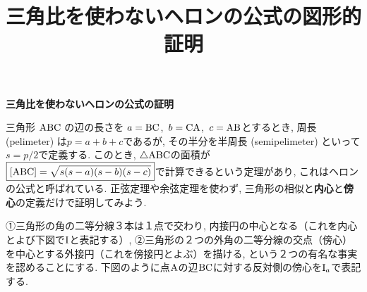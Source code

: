 \documentclass[a4paper,11pt]{ltjsarticle}
\title{三角比を使わないヘロンの公式の図形的証明}
\author{}
\date{}
\begin{document}
\begin{center}
{\bf \large 三角比を使わないヘロンの公式の証明}
\end{center}

三角形 ${\rm ABC}$ の辺の長さを $a={\rm BC}$,\, $b={\rm CA}$,\, $c={\rm AB}$とするとき, 周長 (pelimeter) は$p=a+b+c$であるが, その半分を半周長 (semipelimeter) といって$s=p/2$で定義する. このとき, $\triangle{\rm ABC}$の面積が
$\boxed{[{\rm ABC}]=\sqrt{s(s-a)(s-b)(s-c)}}$で計算できるという定理があり, これはヘロンの公式と呼ばれている. 正弦定理や余弦定理を使わず, 三角形の相似と{\bf 内心}と{\bf 傍心}の定義だけで証明してみよう. 

①三角形の角の二等分線３本は１点で交わり, 内接円の中心となる（これを内心とよび下図で$\rm I$と表記する）, ②三角形の２つの外角の二等分線の交点（傍心）を中心とする外接円（これを傍接円とよぶ）を描ける,  という２つの有名な事実を認めることにする.  下図のように点$\rm A$の辺$\rm BC$に対する反対側の傍心を${\rm I}_a$で表記する.
\end{document}

